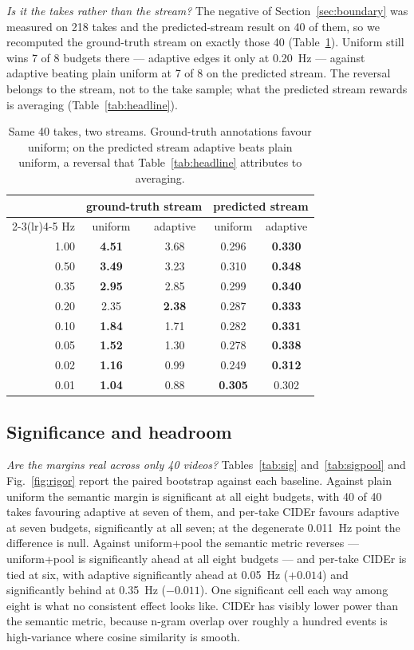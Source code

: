 \documentclass[journal]{IEEEtran}
\newcommand{\best}[1]{\cellcolor{hl}\textbf{#1}}
\begin{document}
\emph{Is it the takes rather than the stream?} The negative of
Section~\ref{sec:boundary} was measured on 218 takes and the predicted-stream
result on 40 of them, so we recomputed the ground-truth stream on exactly those 40
(Table~\ref{tab:sametakes}). Uniform still wins 7 of 8 budgets there --- adaptive
edges it only at 0.20~Hz --- against adaptive beating plain uniform at 7 of 8 on
the predicted stream. The reversal belongs to the stream, not to the take sample;
what the predicted stream rewards is averaging (Table~\ref{tab:headline}).

\begin{table}[t]
\caption{Same 40 takes, two streams. Ground-truth annotations favour uniform; on
the predicted stream adaptive beats plain uniform, a reversal that
Table~\ref{tab:headline} attributes to averaging.}
\label{tab:sametakes}
\centering
\footnotesize
\setlength{\tabcolsep}{4pt}
\begin{tabular}{rcccc}
\toprule
& \multicolumn{2}{c}{ground-truth stream} & \multicolumn{2}{c}{predicted stream} \\
\cmidrule(lr){2-3}\cmidrule(lr){4-5}
Hz & uniform & adaptive & uniform & adaptive \\
\midrule
1.00 & \best{4.51} & 3.68 & 0.296 & \best{0.330} \\
0.50 & \best{3.49} & 3.23 & 0.310 & \best{0.348} \\
0.35 & \best{2.95} & 2.85 & 0.299 & \best{0.340} \\
0.20 & 2.35 & \best{2.38} & 0.287 & \best{0.333} \\
0.10 & \best{1.84} & 1.71 & 0.282 & \best{0.331} \\
0.05 & \best{1.52} & 1.30 & 0.278 & \best{0.338} \\
0.02 & \best{1.16} & 0.99 & 0.249 & \best{0.312} \\
0.01 & \best{1.04} & 0.88 & \best{0.305} & 0.302 \\
\bottomrule
\end{tabular}
\end{table}

\subsection{Significance and headroom}
\label{sec:rigor}
\emph{Are the margins real across only 40 videos?} Tables~\ref{tab:sig}
and~\ref{tab:sigpool} and Fig.~\ref{fig:rigor} report the paired bootstrap against
each baseline. Against
plain uniform the semantic margin is significant at all eight budgets, with 40 of
40 takes favouring adaptive at seven of them, and per-take CIDEr favours adaptive
at seven budgets, significantly at all seven; at the degenerate 0.011~Hz point the
difference is null. Against uniform+pool the semantic metric reverses ---
uniform+pool is significantly ahead at all eight budgets --- and per-take CIDEr is
tied at six, with adaptive significantly ahead at 0.05~Hz ($+0.014$) and
significantly behind at 0.35~Hz ($-0.011$). One significant cell each way among
eight is what no consistent effect looks like. CIDEr has visibly lower power than
the semantic metric, because n-gram overlap over roughly a hundred events is
high-variance where cosine similarity is smooth.
\end{document}
